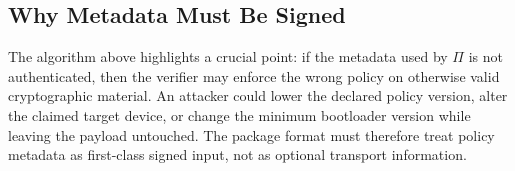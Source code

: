 \subsection{Why Metadata Must Be Signed}

The algorithm above highlights a crucial point: if the metadata used by $\Pi$ is not authenticated, then the verifier may enforce the wrong policy on otherwise valid cryptographic material. An attacker could lower the declared policy version, alter the claimed target device, or change the minimum bootloader version while leaving the payload untouched. The package format must therefore treat policy metadata as first-class signed input, not as optional transport information.
